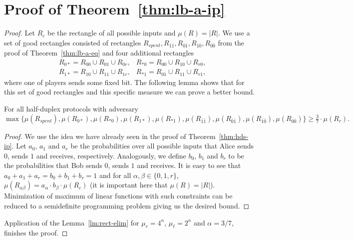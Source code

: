 \section{Proof of Theorem~\ref{thm:lb-a-ip}}
\begin{proof}
Let $R_c$ be the rectangle of all possible inputs and $\mu(R) = |R|$. 
We use a set of good rectangles consisted of rectangles
$R_{spent}, R_{\bar 1 \bar 1}, R_{\bar 0 \bar 1}, R_{\bar 1 \bar 0}, R_{\bar 0 \bar 0}$ 
from the proof of Theorem~\ref{thm:lb-a-eq} and four additional rectangles
\begin{align*}
&R_{0*} = R_{00}\cup R_{01}\cup R_{0r},
&R_{*0} = R_{00}\cup R_{10}\cup R_{r0},\\
&R_{1*} = R_{10}\cup R_{11}\cup R_{1r},
&R_{*1} = R_{01}\cup R_{11}\cup R_{r1},
\end{align*}
where one of players sends some fixed bit. 
The following lemma shows that for this set of good rectangles and 
this specific measure we can prove a better bound.

\begin{lemma}\label{lm:lp3/7}
For all half-duplex protocols with adversary
\[
\max\bigl\{
\mu(R_{spent}), 
\mu(R_{0*}),
\mu(R_{*0}),
\mu(R_{1*}),
\mu(R_{*1}),
\mu(R_{\bar 1 \bar 1}),
\mu(R_{\bar 0 \bar 1}),
\mu(R_{\bar 1 \bar 0}),
\mu(R_{\bar 0 \bar 0})\bigr\} \ge \tfrac{3}{7}\cdot \mu(R_c).
\]
\end{lemma}
\begin{proof}
We use the idea we have already seen in the proof of Theorem~\ref{thm:hds-ip}.
Let $a_0$, $a_1$ and $a_r$ be the probabilities over all possible inputs that Alice sends $0$, sends $1$ and receives, respectively. 
Analogously, we define $b_0$, $b_1$ and $b_r$ 
to be the probabilities that Bob sends $0$,
sends $1$ and receives.
It is easy to see that $a_0+a_1+a_r = b_0+b_1+b_r = 1$ and 
for all $\alpha,\beta \in \{0,1,r\}$, $\mu(R_{\alpha\beta}) = a_\alpha\cdot b_\beta\cdot \mu(R_c)$
(it is important here that $\mu(R) = |R|$).
Minimization of maximum of linear functions with such constraints can be reduced to a
semidefinite programming problem giving us the desired bound.
\end{proof}
Application of the Lemma~\ref{lm:rect-elim} for $\mu_r = 4^n$, $\mu_\ell = 2^n$ and $\alpha = 3/7$,
finishes the proof.
\end{proof}

